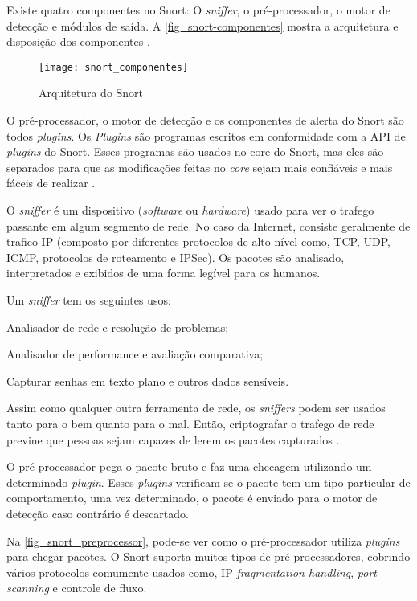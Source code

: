 Existe quatro componentes no Snort: O \textit{sniffer}, o pré-processador, o motor de detecção e módulos de saída. A \autoref{fig_snort-componentes} mostra a arquitetura e disposição dos componentes \cite{snort:andrew}.

\begin{figure}[!htb]
  \centering
  \caption{Arquitetura do Snort} \label{fig_snort-componentes}
  \texttt{[image: snort\_componentes]}
\end{figure}

O pré-processador, o motor de detecção e os componentes de alerta do Snort são todos \textit{plugins}. Os \textit{Plugins} são programas escritos em conformidade com a API de \textit{plugins} do Snort. Esses programas são usados no core do Snort, mas eles são separados para que as modificações feitas no \textit{core} sejam mais confiáveis e mais fáceis de realizar \cite{snort:andrew}.

O \textit{sniffer} é um dispositivo (\textit{software} ou \textit{hardware}) usado para ver o trafego passante em algum segmento de rede. No caso da Internet, consiste geralmente de trafico IP (composto por diferentes protocolos de alto nível como, TCP, UDP, ICMP, protocolos de roteamento e IPSec). Os pacotes são analisado, interpretados e exibidos de uma forma legível para os humanos.

Um \textit{sniffer} tem os seguintes usos:

\begin{alineas}
\item Analisador de rede e resolução de problemas;
\item Analisador de performance e avaliação comparativa;
\item Capturar senhas em texto plano e outros dados sensíveis.
\end{alineas}

Assim como qualquer outra ferramenta de rede, os \textit{sniffers} podem ser usados tanto para o bem quanto para o mal. Então, criptografar o trafego de rede previne que pessoas sejam capazes de lerem os pacotes capturados \cite{snort:andrew}.

O pré-processador pega o pacote bruto e faz uma checagem utilizando um determinado \textit{plugin}. Esses \textit{plugins} verificam se o pacote tem um tipo particular de comportamento, uma vez determinado, o pacote é enviado para o motor de detecção caso contrário é descartado.

Na \autoref{fig_snort_preprocessor}, pode-se ver como o pré-processador utiliza \textit{plugins} para chegar pacotes. O Snort suporta muitos tipos de pré-processadores, cobrindo vários protocolos comumente usados como, IP \textit{fragmentation handling}, \textit{port scanning} e controle de fluxo.

